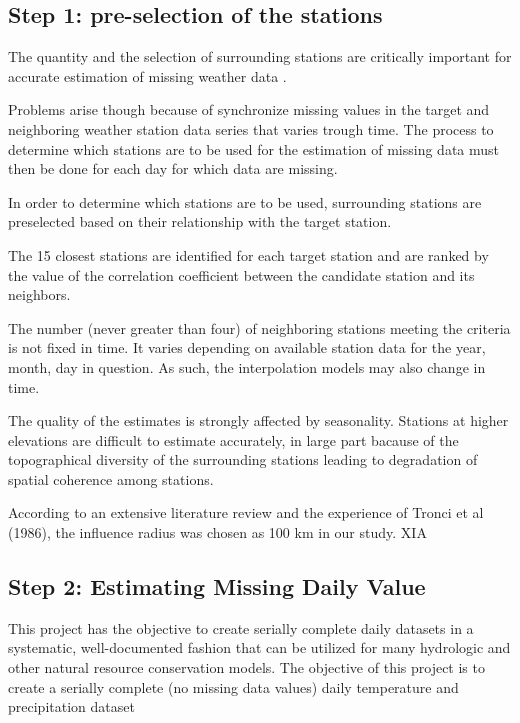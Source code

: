 \documentclass[WHATMANUAL.tex]{subfiles}
\begin{document}
\subsection{Step 1: pre-selection of the stations}

The quantity and the selection of surrounding stations are critically important for accurate estimation of missing weather data \citep{eischeid_quality_1995}.


Problems arise though because of synchronize missing values in the target and neighboring weather station data series that varies trough time. The process to determine which stations are to be used for the estimation of missing data must then be done for each day for which data are missing.

In order to determine which stations are to be used, surrounding stations are preselected based on their relationship with the target station.

The 15 closest stations are identified for each target station and are ranked by the value of the correlation coefficient between the candidate station and its neighbors.

The number (never greater than four) of neighboring stations meeting the criteria is not fixed in time. It varies depending on available station data for the year, month, day in question. As such, the interpolation models may also change in time.

The quality of the estimates is strongly affected by seasonality. Stations at higher elevations are difficult to estimate accurately, in large part bacause of the topographical diversity of the surrounding stations leading to degradation of spatial coherence among stations.

According to an extensive literature review and the experience of Tronci et al (1986), the influence radius was chosen as 100 km in our study. XIA

\subsection{Step 2: Estimating Missing Daily Value}

This project \citep{eischeid_creating_2000} has the objective to create serially complete daily datasets in a systematic, well-documented fashion that can be utilized for many hydrologic and other natural resource conservation models. The objective of this project is to create a serially complete (no missing data values) daily temperature and precipitation dataset
\end{document}
